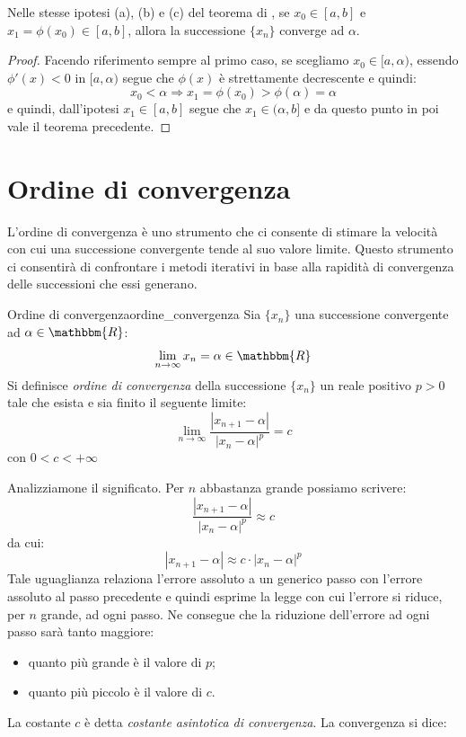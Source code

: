 \documentclass[12pt]{report}
\newcounter{corollary}
\newcounter{definition}
\newcommand{\namerefl}[1]{%
	\bgroup
	\let\nmu\MakeLowercase
	\nameref{#1}\egroup}
\newcommand{\nmu}{}
\begin{document}
\begin{corollary}{}{}
	Nelle stesse ipotesi (a), (b) e (c) del teorema di \namerefl{th:newton_conv_globale}, se $x_0 \in [a, b]$ e $x_1 = \phi(x_0) \in [a, b]$, allora la successione $\{x_n\}$ converge ad $\alpha$.
\end{corollary}
\begin{proof}
	Facendo riferimento sempre al primo caso, se scegliamo $x_0 \in [a, \alpha)$, essendo $\phi'(x) < 0$ in $[a, \alpha)$ segue che $\phi(x)$ è strettamente decrescente e quindi:
	\[
	x_0 < \alpha \Rightarrow x_1  = \phi(x_0) > \phi(\alpha) = \alpha
	\]
	e quindi, dall'ipotesi $x_1 \in [a, b]$ segue che $x_1 \in (\alpha, b]$ e da questo punto in poi vale il teorema precedente.
\end{proof}
\section{Ordine di convergenza}
L'ordine di convergenza è uno strumento che ci consente di stimare la velocità con cui una successione convergente tende al suo valore limite. Questo strumento ci consentirà di confrontare i metodi iterativi in base alla rapidità di convergenza delle successioni che essi generano.
\begin{definition}{\nmu Ordine di convergenza}{ordine_convergenza}
	Sia $\{x_n\}$ una successione convergente ad $\alpha \in \mathbbm{R}$:
	\[
	\lim\limits_{n\to\infty}x_n = \alpha \in \mathbbm{R}
	\]
	Si definisce \textit{ordine di convergenza} della successione $\{x_n\}$ un reale positivo $p > 0$ tale che esista e sia finito il seguente limite:
	\[
	\lim\limits_{n\to\infty}\frac{|x_{n+1} - \alpha|}{|x_n - \alpha|^p} = c
	\]
	con $0 < c < +\infty$
\end{definition}
Analizziamone il significato. Per $n$ abbastanza grande possiamo scrivere:
\[
\frac{|x_{n+1} - \alpha|}{|x_n - \alpha|^p} \approx c
\]
da cui:
\[
|x_{n+1}-\alpha| \approx c \cdot  |x_n - \alpha|^p
\]
Tale uguaglianza relaziona l'errore assoluto a un generico passo con l'errore assoluto al passo precedente e quindi esprime la legge con cui l'errore si riduce, per $n$ grande, ad ogni passo. Ne consegue che la riduzione dell'errore ad ogni passo sarà tanto maggiore:
\begin{itemize}
	\item quanto più grande è il valore di $p$;
	\item quanto più piccolo è il valore di $c$.
\end{itemize}
La costante $c$ è detta \textit{costante asintotica di convergenza}. La convergenza si dice:
\end{document}
